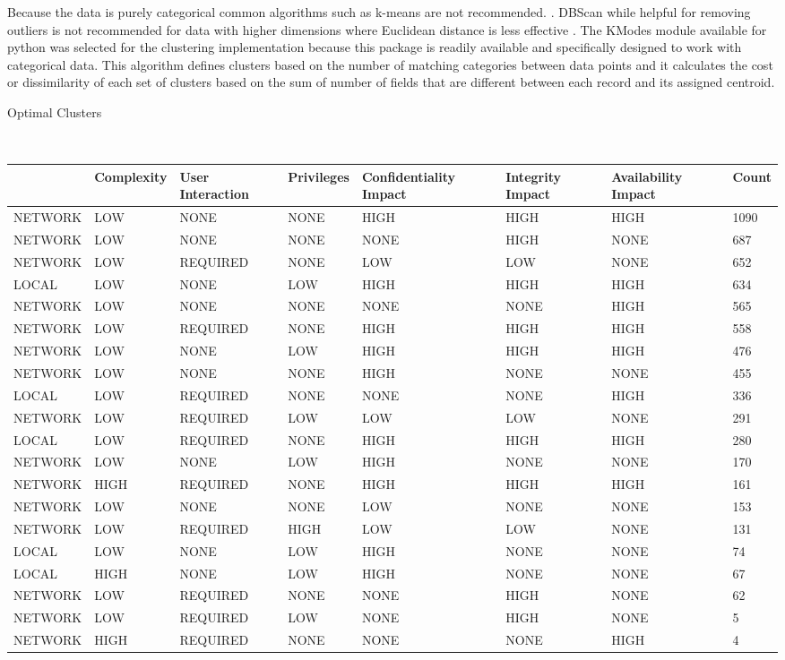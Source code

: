 \documentclass{article} %
\begin{document}
Because the data is purely categorical common algorithms such as k-means are not recommended. \cite{}.  DBScan while helpful for removing outliers is not recommended for data with higher dimensions where Euclidean distance is less effective \cite{}.  The KModes module available for python was selected for the clustering implementation \cite{https://pypi.org/project/kmodes/}  because this package is readily available and specifically designed to work with categorical data.
This algorithm defines clusters based on the number of matching categories between data points and it calculates the cost or dissimilarity of each set of clusters based on the sum of number of fields that are different between each record and its assigned centroid.

\begin{center}
\caption{Optimal Clusters} \\
\begin{tabular}{ |l|p{1.1cm}|l|p{1.1cm}|p{1.4cm}|p{1.1cm}|p{1.4cm}|p{1.1cm}| } \hline
\small{Attack Vector & Complexity & User Interaction & Privileges & Confidentiality Impact & Integrity Impact & Availability Impact & Count} \\ \hline
NETWORK & LOW & NONE & NONE & HIGH & HIGH & HIGH & 1090 \\
NETWORK & LOW & NONE & NONE & NONE & HIGH & NONE & 687 \\ 
NETWORK & LOW & REQUIRED & NONE & LOW & LOW & NONE & 652 \\
LOCAL & LOW & NONE & LOW & HIGH & HIGH & HIGH & 634 \\
NETWORK & LOW & NONE & NONE & NONE & NONE & HIGH & 565 \\
NETWORK & LOW & REQUIRED & NONE & HIGH & HIGH & HIGH & 558 \\
NETWORK & LOW & NONE & LOW & HIGH & HIGH & HIGH & 476 \\
NETWORK & LOW & NONE & NONE & HIGH & NONE & NONE & 455 \\
LOCAL & LOW & REQUIRED & NONE & NONE & NONE & HIGH & 336 \\
NETWORK & LOW & REQUIRED & LOW & LOW & LOW & NONE & 291 \\
LOCAL & LOW & REQUIRED & NONE & HIGH & HIGH & HIGH & 280 \\
NETWORK & LOW & NONE & LOW & HIGH & NONE & NONE & 170 \\
NETWORK & HIGH & REQUIRED & NONE & HIGH & HIGH & HIGH & 161 \\
NETWORK & LOW & NONE & NONE & LOW & NONE & NONE & 153 \\
NETWORK & LOW & REQUIRED & HIGH & LOW & LOW & NONE & 131 \\
LOCAL & LOW & NONE & LOW & HIGH & NONE & NONE & 74 \\
LOCAL & HIGH & NONE & LOW & HIGH & NONE & NONE & 67 \\
NETWORK & LOW & REQUIRED & NONE & NONE & HIGH & NONE & 62  \\
NETWORK & LOW & REQUIRED & LOW & NONE & HIGH & NONE & 5 \\
NETWORK & HIGH & REQUIRED & NONE & NONE & NONE & HIGH & 4 \\
\hline
\end{tabular}
\end{center}
\end{document}
